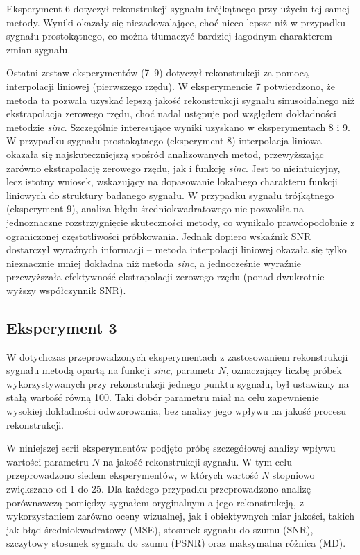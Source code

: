 \documentclass{article}
\begin{document}
    Eksperyment 6 dotyczył rekonstrukcji sygnału trójkątnego przy użyciu tej samej metody. Wyniki 
    okazały się niezadowalające, choć nieco lepsze niż w przypadku sygnału prostokątnego, co można 
    tłumaczyć bardziej łagodnym charakterem zmian sygnału.

    Ostatni zestaw eksperymentów (7–9) dotyczył rekonstrukcji za pomocą interpolacji liniowej 
    (pierwszego rzędu). W eksperymencie 7 potwierdzono, że metoda ta pozwala uzyskać lepszą jakość 
    rekonstrukcji sygnału sinusoidalnego niż ekstrapolacja zerowego rzędu, choć nadal ustępuje pod 
    względem dokładności metodzie \emph{sinc}. Szczególnie interesujące wyniki uzyskano w eksperymentach 
    8 i 9. W przypadku sygnału prostokątnego (eksperyment 8) interpolacja liniowa okazała się 
    najskuteczniejszą spośród analizowanych metod, przewyższając zarówno ekstrapolację zerowego rzędu,
    jak i funkcję \emph{sinc}. Jest to nieintuicyjny, lecz istotny wniosek, wskazujący na dopasowanie 
    lokalnego charakteru funkcji liniowych do struktury badanego sygnału. W przypadku sygnału trójkątnego
    (eksperyment 9), analiza błędu średniokwadratowego nie pozwoliła na jednoznaczne rozstrzygnięcie 
    skuteczności metody, co wynikało prawdopodobnie z ograniczonej częstotliwości próbkowania. Jednak 
    dopiero wskaźnik SNR dostarczył wyraźnych informacji – metoda interpolacji liniowej okazała się tylko 
    nieznacznie mniej dokładna niż metoda \emph{sinc}, a jednocześnie wyraźnie przewyższała efektywność 
    ekstrapolacji zerowego rzędu (ponad dwukrotnie wyższy współczynnik SNR).

    \subsection{Eksperyment 3}
    W dotychczas przeprowadzonych eksperymentach z zastosowaniem rekonstrukcji sygnału metodą 
    opartą na funkcji \emph{sinc}, parametr \(N\), oznaczający liczbę próbek wykorzystywanych 
    przy rekonstrukcji jednego punktu sygnału, był ustawiany na stałą wartość równą 100. 
    Taki dobór parametru miał na celu zapewnienie wysokiej dokładności odwzorowania, bez analizy 
    jego wpływu na jakość procesu rekonstrukcji.

    W niniejszej serii eksperymentów podjęto próbę szczegółowej analizy wpływu wartości parametru \(N\) 
    na jakość rekonstrukcji sygnału. W tym celu przeprowadzono siedem eksperymentów, w których wartość \(N\)
    stopniowo zwiększano od 1 do 25. Dla każdego przypadku przeprowadzono analizę porównawczą pomiędzy 
    sygnałem oryginalnym a jego rekonstrukcją, z wykorzystaniem zarówno oceny wizualnej, jak i 
    obiektywnych miar jakości, takich jak błąd średniokwadratowy (MSE), stosunek sygnału do szumu (SNR), 
    szczytowy stosunek sygnału do szumu (PSNR) oraz maksymalna różnica (MD).
\end{document}

